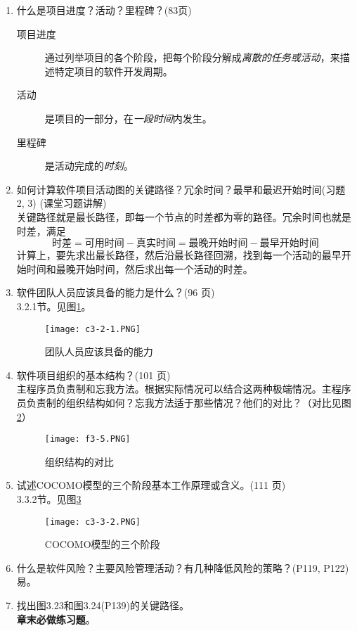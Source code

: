 \documentclass[14pt, letterpaper, UTF8, fontset=windowsnew, heading=true]{article}
\begin{document}
\begin{enumerate}
	\item 什么是项目进度？活动？里程碑？(83页)
	\begin{description}
		\item[项目进度] 通过列举项目的各个阶段，把每个阶段分解成\emph{离散的任务或活动}，来描述特定项目的软件开发周期。
		\item[活动] 是项目的一部分，在\emph{一段时间}内发生。
		\item[里程碑] 是活动完成的\emph{时刻}。
	\end{description}

	\item 如何计算软件项目活动图的关键路径？冗余时间？最早和最迟开始时间(习题 2, 3) (课堂习题讲解)\\
	关键路径就是最长路径，即每一个节点的时差都为零的路径。冗余时间也就是时差，满足
	$$\text{时差} = \text{可用时间} - \text{真实时间} = \text{最晚开始时间} - \text{最早开始时间}$$
	计算上，要先求出最长路径，然后沿最长路径回溯，找到每一个活动的最早开始时间和最晚开始时间，然后求出每一个活动的时差。
	
	\item 软件团队人员应该具备的能力是什么？(96 页)\\
	3.2.1节。见图\ref{fig:personalability}。
	\begin{figure}[h]
		\centering
		\texttt{[image: c3-2-1.PNG]}
		\caption{团队人员应该具备的能力}
		\label{fig:personalability}
	\end{figure}
	
	\item 软件项目组织的基本结构？(101 页) \\
	主程序员负责制和忘我方法。根据实际情况可以结合这两种极端情况。主程序员负责制的组织结构如何？忘我方法适于那些情况？他们的对比？（对比见图\ref{fig:groupstructure}）
	\begin{figure}[h]
		\centering
		\texttt{[image: f3-5.PNG]}
		\caption{组织结构的对比}
		\label{fig:groupstructure}
	\end{figure}
	
	
	\item 试述COCOMO模型的三个阶段基本工作原理或含义。(111 页) \\
	3.3.2节。见图\ref{fig:cocomo}
	\begin{figure}[h]
		\centering
		\texttt{[image: c3-3-2.PNG]}
		\caption{COCOMO模型的三个阶段}
		\label{fig:cocomo}
	\end{figure}
	
	\item 什么是软件风险？主要风险管理活动？有几种降低风险的策略？(P119, P122) \\
	易。
	
	\item 找出图3.23和图3.24(P139)的关键路径。\\
	\textbf{章末必做练习题}。
\end{enumerate}
\end{document}
